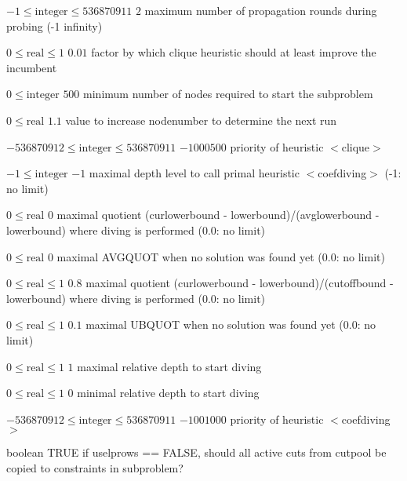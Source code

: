 %
{$-1\leq\textrm{integer}\leq536870911$}%
{$2$}%
{maximum number of propagation rounds during probing (-1 infinity)}%
{}

%
{$0\leq\textrm{real}\leq1$}%
{$0.01$}%
{factor by which clique heuristic should at least improve the incumbent}%
{}

%
{$0\leq\textrm{integer}$}%
{$500$}%
{minimum number of nodes required to start the subproblem}%
{}

%
{$0\leq\textrm{real}$}%
{$1.1$}%
{value to increase nodenumber to determine the next run}%
{}

%
{$-536870912\leq\textrm{integer}\leq536870911$}%
{$-1000500$}%
{priority of heuristic $<$clique$>$}%
{}

%
{$-1\leq\textrm{integer}$}%
{$-1$}%
{maximal depth level to call primal heuristic $<$coefdiving$>$ (-1: no limit)}%
{}

%
{$0\leq\textrm{real}$}%
{$0$}%
{maximal quotient (curlowerbound - lowerbound)/(avglowerbound - lowerbound) where diving is performed (0.0: no limit)}%
{}

%
{$0\leq\textrm{real}$}%
{$0$}%
{maximal AVGQUOT when no solution was found yet (0.0: no limit)}%
{}

%
{$0\leq\textrm{real}\leq1$}%
{$0.8$}%
{maximal quotient (curlowerbound - lowerbound)/(cutoffbound - lowerbound) where diving is performed (0.0: no limit)}%
{}

%
{$0\leq\textrm{real}\leq1$}%
{$0.1$}%
{maximal UBQUOT when no solution was found yet (0.0: no limit)}%
{}

%
{$0\leq\textrm{real}\leq1$}%
{$1$}%
{maximal relative depth to start diving}%
{}

%
{$0\leq\textrm{real}\leq1$}%
{$0$}%
{minimal relative depth to start diving}%
{}

%
{$-536870912\leq\textrm{integer}\leq536870911$}%
{$-1001000$}%
{priority of heuristic $<$coefdiving$>$}%
{}

%
{boolean}%
{TRUE}%
{if uselprows == FALSE, should all active cuts from cutpool be copied to constraints in subproblem?}%
{}

